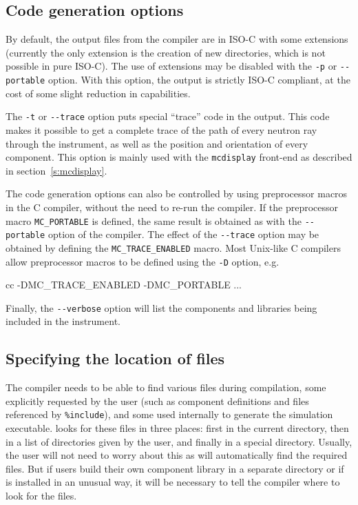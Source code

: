 \subsection{Code generation options}

By default, the output files from the \MCS compiler are in ISO-C with
some extensions (currently the only extension is the creation of new
directories, which is not possible in pure ISO-C). The use of
extensions may be disabled with the \verb+-p+ or \verb+--portable+
option. With this option, the output is strictly ISO-C compliant, at
the cost of some slight reduction in capabilities.

The \verb+-t+ or \verb+--trace+ option puts special ``trace'' code in
the output. This code makes it possible to get a complete trace of the
path of every neutron ray through the instrument, as well as the position
and orientation of every component. This option is mainly used with the
\verb+mcdisplay+ front-end as described in section~\ref{s:mcdisplay}.

The code generation options can also be controlled by using preprocessor
macros in the C compiler, without the need to re-run the \MCS
compiler. If the preprocessor macro \verb+MC_PORTABLE+ is defined, the
same result is obtained as with the \verb+--portable+ option of the
\MCS compiler. The effect of the \verb+--trace+ option may be obtained
by defining the \verb+MC_TRACE_ENABLED+ macro. Most Unix-like C
compilers allow preprocessor macros to be defined using the \verb+-D+
option, e.g.
\begin{bash}
    cc -DMC_TRACE_ENABLED -DMC_PORTABLE ...
\end{bash}
Finally, the \verb+--verbose+ option will list the components and libraries being
included in the instrument.

\subsection{Specifying the location of files}
\label{s:files}

The \MCS compiler needs to be able to find various files during compilation,
some explicitly requested by the user (such as component definitions and files
referenced by \verb+%include+), 
and some used internally to generate the simulation executable. \MCS looks for
these files in three places: first in the current directory, then in a list of
directories given by the user, and finally in a special \MCS
directory. Usually, the user will not need to worry about this as \MCS will
automatically find the required files. But if users build their own component
library in a separate directory or if \MCS is installed in an unusual way, it
will be necessary to tell the compiler where to look for the files.

